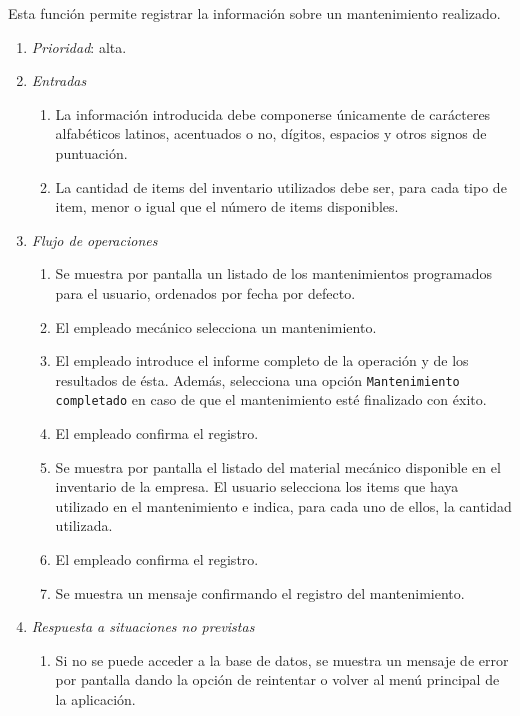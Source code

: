 

	Esta función permite registrar la información sobre un mantenimiento realizado.

	\begin{enumerate}
		\item \textit{Prioridad}: alta.
		\item \textit{Entradas}
		\begin{enumerate}
			\item La información introducida debe componerse únicamente de carácteres alfabéticos latinos, acentuados o no, dígitos, espacios y otros signos de puntuación.
			\item La cantidad de items del inventario utilizados debe ser, para cada tipo de item, menor o igual que el número de items disponibles.
		\end{enumerate}
		\item \textit{Flujo de operaciones}
		\begin{enumerate}
			\item Se muestra por pantalla un listado de los mantenimientos programados para el usuario, ordenados por fecha por defecto.
			\item El empleado mecánico selecciona un mantenimiento.
			\item El empleado introduce el informe completo de la operación y de los resultados de ésta. Además, selecciona una opción \verb|Mantenimiento completado| en caso de que el mantenimiento esté finalizado con éxito. 
			\item El empleado confirma el registro.
			\item Se muestra por pantalla el listado del material mecánico disponible en el inventario de la empresa. El usuario selecciona los items que haya utilizado en el mantenimiento e indica, para cada uno de ellos, la cantidad utilizada.
			\item El empleado confirma el registro.
			\item Se muestra un mensaje confirmando el registro del mantenimiento.
		\end{enumerate}
		\item \textit{Respuesta a situaciones no previstas}
		\begin{enumerate}
			\item Si no se puede acceder a la base de datos, se muestra un mensaje de error por pantalla dando la opción de reintentar o volver al menú principal de la aplicación.
		\end{enumerate}
	\end{enumerate}
